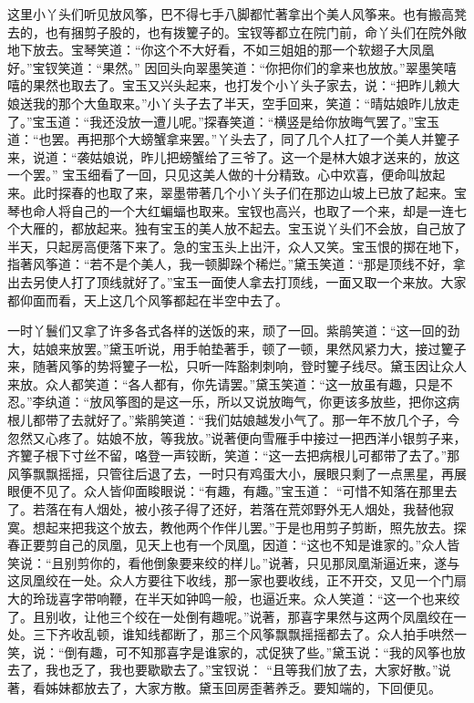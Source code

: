 \begin{parag}


    这里小丫头们听见放风筝，巴不得七手八脚都忙著拿出个美人风筝来。也有搬高凳去的，也有捆剪子股的，也有拨籰子的。宝钗等都立在院门前，命丫头们在院外敞地下放去。宝琴笑道：“你这个不大好看，不如三姐姐的那一个软翅子大凤凰好。”宝钗笑道：“果然。” 因回头向翠墨笑道：“你把你们的拿来也放放。”翠墨笑嘻嘻的果然也取去了。宝玉又兴头起来，也打发个小丫头子家去，说：“把昨儿赖大娘送我的那个大鱼取来。”小丫头子去了半天，空手回来，笑道：“晴姑娘昨儿放走了。”宝玉道：“我还没放一遭儿呢。”探春笑道：“横竖是给你放晦气罢了。”宝玉道：“也罢。再把那个大螃蟹拿来罢。”丫头去了，同了几个人扛了一个美人并籰子来，说道：“袭姑娘说，昨儿把螃蟹给了三爷了。这一个是林大娘才送来的，放这一个罢。” 宝玉细看了一回，只见这美人做的十分精致。心中欢喜，便命叫放起来。此时探春的也取了来，翠墨带著几个小丫头子们在那边山坡上已放了起来。宝琴也命人将自己的一个大红蝙蝠也取来。宝钗也高兴，也取了一个来，却是一连七个大雁的，都放起来。独有宝玉的美人放不起去。宝玉说丫头们不会放，自己放了半天，只起房高便落下来了。急的宝玉头上出汗，众人又笑。宝玉恨的掷在地下，指著风筝道：“若不是个美人，我一顿脚跺个稀烂。”黛玉笑道：“那是顶线不好，拿出去另使人打了顶线就好了。”宝玉一面使人拿去打顶线，一面又取一个来放。大家都仰面而看，天上这几个风筝都起在半空中去了。
\end{parag}


\begin{parag}


    一时丫鬟们又拿了许多各式各样的送饭的来，顽了一回。紫鹃笑道：“这一回的劲大，姑娘来放罢。”黛玉听说，用手帕垫著手，顿了一顿，果然风紧力大，接过籰子来，随著风筝的势将籰子一松，只听一阵豁刺刺响，登时籰子线尽。黛玉因让众人来放。众人都笑道：“各人都有，你先请罢。”黛玉笑道：“这一放虽有趣，只是不忍。”李纨道：“放风筝图的是这一乐，所以又说放晦气，你更该多放些，把你这病根儿都带了去就好了。”紫鹃笑道：“我们姑娘越发小气了。那一年不放几个子，今忽然又心疼了。姑娘不放，等我放。”说著便向雪雁手中接过一把西洋小银剪子来，齐籰子根下寸丝不留，咯登一声铰断，笑道：“这一去把病根儿可都带了去了。”那风筝飘飘摇摇，只管往后退了去，一时只有鸡蛋大小，展眼只剩了一点黑星，再展眼便不见了。众人皆仰面睃眼说：“有趣，有趣。”宝玉道： “可惜不知落在那里去了。若落在有人烟处，被小孩子得了还好，若落在荒郊野外无人烟处，我替他寂寞。想起来把我这个放去，教他两个作伴儿罢。”于是也用剪子剪断，照先放去。探春正要剪自己的凤凰，见天上也有一个凤凰，因道：“这也不知是谁家的。”众人皆笑说：“且别剪你的，看他倒象要来绞的样儿。”说著，只见那凤凰渐逼近来，遂与这凤凰绞在一处。众人方要往下收线，那一家也要收线，正不开交，又见一个门扇大的玲珑喜字带响鞭，在半天如钟鸣一般，也逼近来。众人笑道：“这一个也来绞了。且别收，让他三个绞在一处倒有趣呢。”说著，那喜字果然与这两个凤凰绞在一处。三下齐收乱顿，谁知线都断了，那三个风筝飘飘摇摇都去了。众人拍手哄然一笑，说：“倒有趣，可不知那喜字是谁家的，忒促狭了些。”黛玉说：“我的风筝也放去了，我也乏了，我也要歇歇去了。”宝钗说： “且等我们放了去，大家好散。”说著，看姊妹都放去了，大家方散。黛玉回房歪著养乏。要知端的，下回便见。
\end{parag}

